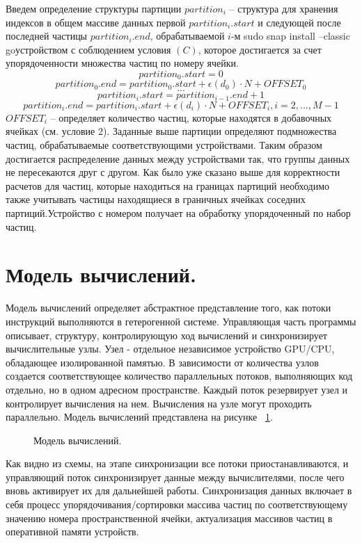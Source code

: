 Введем определение структуры партиции \(partition_i\) – структура для хранения индексов в общем массиве данных первой \(partition_{i}.start\) и следующей после последней частицы \(partition_{i}.end\), обрабатываемой \(i\)-м sudo snap install --classic goустройством с соблюдением условия
\((C)\), которое достигается за счет упорядоченности множества частиц по номеру ячейки.
\[
  partition_{0}.start = 0
\]
\[
  partition_{0}.end = partition_{0}.start + \epsilon (d_0) \cdot N + OFFSET_0
\]
\[
  ...
\]
\[
  partition_{i}.start = partition_{i-1}.end + 1
\]
\[
  partition_{i}.end = partition_{i}.start + \epsilon (d_i) \cdot N + OFFSET_i, i=2,..., M - 1
\]
\(OFFSET_i\) – определяет количество частиц, которые находятся в добавочных ячейках (см. условие 2).
Заданные выше партиции определяют подмножества частиц, обрабатываемые соответствующими устройствами. Таким образом достигается распределение данных между устройствами так, что группы данных не пересекаются друг с другом. Как было уже сказано выше для корректности расчетов для частиц, которые находиться на границах партиций необходимо также учитывать частицы находящиеся в граничных ячейках соседних партиций.Устройство с номером  получает на обработку упорядоченный по  набор частиц. 

\section{Модель вычислений.}\label{sec:ch3/sect2}

Модель вычислений определяет абстрактное представление того, как потоки инструкций выполняются в гетерогенной системе. Управляющая часть программы описывает, структуру, контролирующую ход вычислений и синхронизирует вычислительные узлы. Узел - отдельное независимое устройство GPU/CPU, обладающее изолированной памятью. В зависимости от количества узлов создается соответствующее количество параллельных потоков, выполняющих код отдельно, но в одном адресном пространстве. Каждый поток резервирует узел и контролирует вычисления на нем. Вычисления на узле могут проходить параллельно. Модель вычислений представлена на рисунке ~\ref{fig:calc1}.
\begin{figure}[ht]
  \caption{Модель вычислений.}\label{fig:calc1}
\end{figure}

Как видно из схемы, на этапе синхронизации все потоки  приостанавливаются, и управляющий поток синхронизирует данные между вычислителями, после чего вновь активирует их для дальнейшей работы. Синхронизация данных включает в себя процесс упорядочивания/сортировки массива частиц по соответствующему значению номера пространственной ячейки, актуализация массивов частиц в оперативной памяти устройств.

